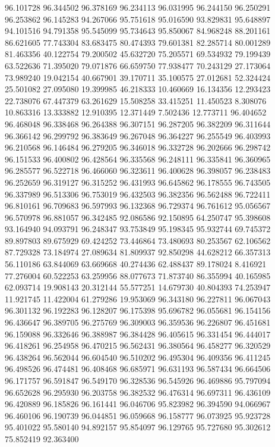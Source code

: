 96.101728
96.344502
96.378169
96.234113
96.031995
96.244150
96.250291
96.253862
96.145283
94.267066
95.751618
95.016590
93.829831
95.648897
94.101516
94.791358
95.545099
95.734643
95.850067
84.968248
88.201161
86.621605
77.743304
83.683475
80.474393
79.601381
82.285714
80.001289
81.463356
40.122754
79.200502
45.632720
75.205571
69.534932
79.199439
63.522636
71.395020
79.071876
66.659750
77.938477
70.243129
27.173064
73.989240
19.042154
40.667901
39.170711
35.100575
27.012681
52.324424
25.501082
27.095080
19.399985
46.218333
10.460669
16.134356
12.293423
22.738076
67.447379
63.261629
15.508258
33.415251
11.450523
8.308076
10.863316
13.333882
12.910395
12.371449
7.502436
12.773711
96.404652
96.468048
96.338468
96.264388
96.307151
96.287205
96.382209
96.311644
96.366142
96.299792
96.383649
96.267048
96.364227
96.255549
96.403993
96.210568
96.146484
96.279205
96.346018
96.332728
96.202666
96.298742
96.151533
96.400802
96.428564
96.335568
96.248111
96.335841
96.360965
96.285577
96.522718
96.466060
96.323611
96.400628
96.398057
96.238483
96.252659
96.319127
96.315252
96.431993
96.645862
96.178555
96.743505
96.337989
96.513306
96.753019
96.432503
96.382356
96.562488
96.722411
96.810161
96.709683
96.597993
96.132368
96.729374
96.761612
95.056567
96.570978
96.881057
96.342485
92.086586
92.150895
64.250747
95.398608
93.164940
94.093791
96.248347
93.753849
95.198345
95.932744
69.745372
89.897803
89.675929
69.424252
73.446864
73.480693
80.253567
62.106562
87.729328
73.184974
27.089634
81.809937
92.850298
44.628212
66.357313
56.110186
63.844069
63.669668
40.274436
62.488437
89.178024
8.416921
77.276004
60.522253
63.259956
88.077673
71.873740
86.355994
40.165985
62.093714
19.908143
20.312144
55.577251
14.679730
40.804393
74.253947
11.921745
11.422004
61.279286
19.953069
96.343180
96.227811
96.067043
96.301132
96.192283
96.128207
96.175398
95.696782
96.055681
96.154156
96.436647
96.389705
96.275769
96.309003
96.359536
96.226807
96.451681
96.159088
96.332646
96.388987
96.384428
96.405615
96.331454
96.444017
96.418261
96.254958
96.470215
96.562431
96.380564
96.458277
96.320529
96.438264
96.562044
96.604540
96.510202
96.495304
96.409356
96.411245
96.498526
96.474481
96.408468
96.685971
96.631193
96.587434
96.664506
96.171757
96.591847
96.549170
96.328536
96.545926
96.469886
95.797094
96.652628
96.295930
96.203758
96.382532
96.476314
96.697311
96.436109
96.420889
96.185826
96.161441
96.046706
95.823982
96.394590
94.066967
96.460106
96.190739
96.044851
96.059668
96.158777
96.073925
95.923728
95.401022
95.580140
94.892157
95.854097
96.129765
95.727680
95.302612
75.852419
92.363400
